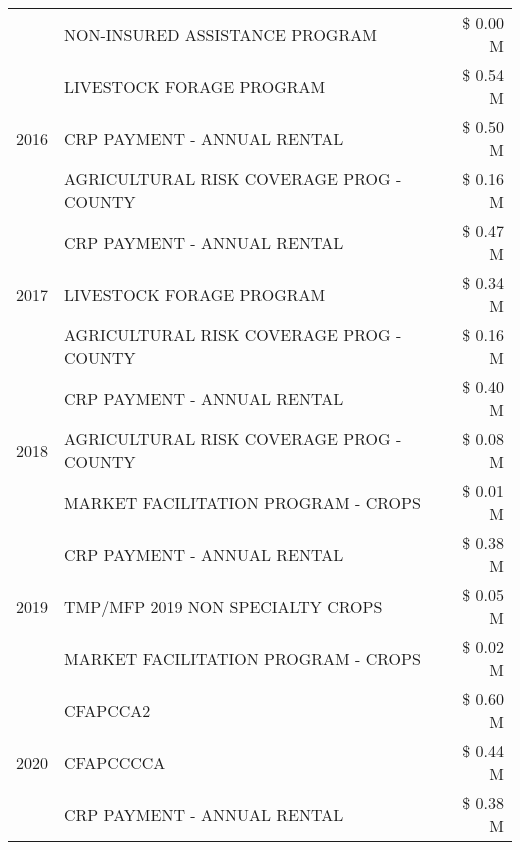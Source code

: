 \begin{tabular}{llr}
 & NON-INSURED ASSISTANCE PROGRAM & \$ 0.00 M \\
\cline{1-3}
\multirow[t]{3}{*}{2016} & LIVESTOCK FORAGE PROGRAM & \$ 0.54 M \\
 & CRP PAYMENT - ANNUAL RENTAL & \$ 0.50 M \\
 & AGRICULTURAL RISK COVERAGE PROG - COUNTY & \$ 0.16 M \\
\cline{1-3}
\multirow[t]{3}{*}{2017} & CRP PAYMENT - ANNUAL RENTAL & \$ 0.47 M \\
 & LIVESTOCK FORAGE PROGRAM & \$ 0.34 M \\
 & AGRICULTURAL RISK COVERAGE PROG - COUNTY & \$ 0.16 M \\
\cline{1-3}
\multirow[t]{3}{*}{2018} & CRP PAYMENT - ANNUAL RENTAL & \$ 0.40 M \\
 & AGRICULTURAL RISK COVERAGE PROG - COUNTY & \$ 0.08 M \\
 & MARKET FACILITATION PROGRAM - CROPS & \$ 0.01 M \\
\cline{1-3}
\multirow[t]{3}{*}{2019} & CRP PAYMENT - ANNUAL RENTAL & \$ 0.38 M \\
 & TMP/MFP 2019 NON SPECIALTY CROPS & \$ 0.05 M \\
 & MARKET FACILITATION PROGRAM - CROPS & \$ 0.02 M \\
\cline{1-3}
\multirow[t]{3}{*}{2020} & CFAPCCA2 & \$ 0.60 M \\
 & CFAPCCCCA & \$ 0.44 M \\
 & CRP PAYMENT - ANNUAL RENTAL & \$ 0.38 M \\
\cline{1-3}
\bottomrule
\end{tabular}
